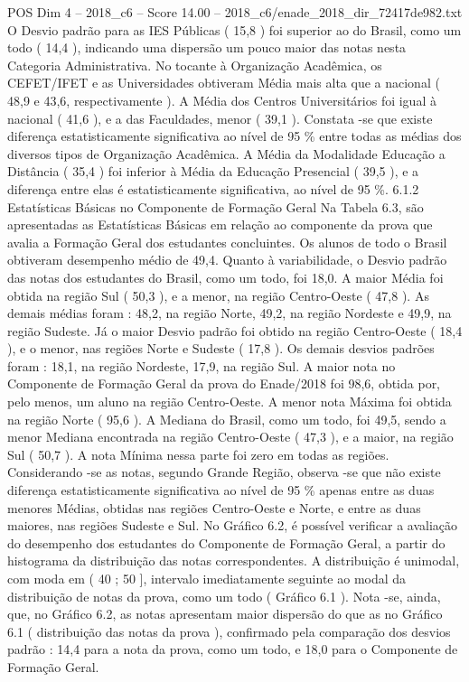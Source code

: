 \begin{textsample}{POS Dim 4 – 2018\_c6 – Score 14.00 – 2018\_c6/enade\_2018\_dir\_72417de982.txt}
O Desvio padrão para as IES Públicas ( 15,8 ) foi superior ao do Brasil, como um todo ( 14,4 ), indicando uma dispersão um pouco maior das notas nesta Categoria Administrativa.
No tocante à Organização Acadêmica, os CEFET/IFET e as Universidades obtiveram Média mais alta que a nacional ( 48,9 e 43,6, respectivamente ).
A Média dos Centros Universitários foi igual à nacional ( 41,6 ), e a das Faculdades, menor ( 39,1 ).
Constata -se que existe diferença estatisticamente significativa ao nível de 95 \% entre todas as médias dos diversos tipos de Organização Acadêmica.
A Média da Modalidade Educação a Distância ( 35,4 ) foi inferior à Média da Educação Presencial ( 39,5 ), e a diferença entre elas é estatisticamente significativa, ao nível de 95 \%. 6.1.2 Estatísticas Básicas no Componente de Formação Geral Na Tabela 6.3, são apresentadas as Estatísticas Básicas em relação ao componente da prova que avalia a Formação Geral dos estudantes concluintes.
Os alunos de todo o Brasil obtiveram desempenho médio de 49,4.
Quanto à variabilidade, o Desvio padrão das notas dos estudantes do Brasil, como um todo, foi 18,0.
A maior Média foi obtida na região Sul ( 50,3 ), e a menor, na região Centro-Oeste ( 47,8 ).
As demais médias foram : 48,2, na região Norte, 49,2, na região Nordeste e 49,9, na região Sudeste.
Já o maior Desvio padrão foi obtido na região Centro-Oeste ( 18,4 ), e o menor, nas regiões Norte e Sudeste ( 17,8 ).
Os demais desvios padrões foram : 18,1, na região Nordeste, 17,9, na região Sul.
A maior nota no Componente de Formação Geral da prova do Enade/2018 foi 98,6, obtida por, pelo menos, um aluno na região Centro-Oeste.
A menor nota Máxima foi obtida na região Norte ( 95,6 ).
A Mediana do Brasil, como um todo, foi 49,5, sendo a menor Mediana encontrada na região Centro-Oeste ( 47,3 ), e a maior, na região Sul ( 50,7 ).
A nota Mínima nessa parte foi zero em todas as regiões.
Considerando -se as notas, segundo Grande Região, observa -se que não existe diferença estatisticamente significativa ao nível de 95 \% apenas entre as duas menores Médias, obtidas nas regiões Centro-Oeste e Norte, e entre as duas maiores, nas regiões Sudeste e Sul.
No Gráfico 6.2, é possível verificar a avaliação do desempenho dos estudantes do Componente de Formação Geral, a partir do histograma da distribuição das notas correspondentes.
A distribuição é unimodal, com moda em ( 40 ; 50 ], intervalo imediatamente seguinte ao modal da distribuição de notas da prova, como um todo ( Gráfico 6.1 ).
Nota -se, ainda, que, no Gráfico 6.2, as notas apresentam maior dispersão do que as no Gráfico 6.1 ( distribuição das notas da prova ), confirmado pela comparação dos desvios padrão : 14,4 para a nota da prova, como um todo, e 18,0 para o Componente de Formação Geral.

\end{textsample}
